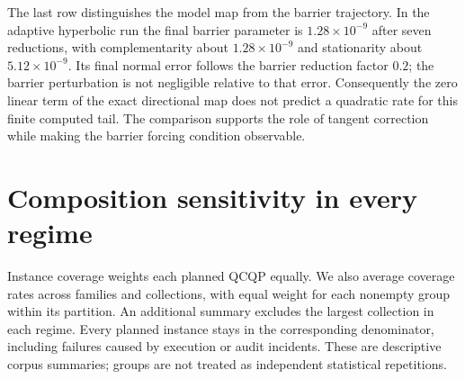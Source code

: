 \documentclass[pdflatex,sn-mathphys-num]{sn-jnl}
\theoremstyle{thmstyleone}
\theoremstyle{thmstylethree}
\begin{document}
The last row distinguishes the model map from the barrier trajectory. In the adaptive hyperbolic run the final barrier parameter
is $1.28\times10^{-9}$ after seven reductions, with complementarity
about $1.28\times10^{-9}$ and stationarity about $5.12\times10^{-9}$.
Its final normal error follows the barrier reduction factor $0.2$;
the barrier perturbation is not negligible relative to that error.
Consequently the zero linear term of the exact directional map does
not predict a quadratic rate for this finite computed tail. The
comparison supports the role of tangent correction while making the
barrier forcing condition observable.

\FloatBarrier
\section{Composition sensitivity in every regime}\label{app:composition}
Instance coverage weights each planned QCQP equally. We also average
coverage rates across families and collections, with equal weight for
each nonempty group within its partition. An additional summary excludes the largest collection in each regime. Every planned instance stays in the corresponding denominator,
including failures caused by execution or audit incidents.
These are descriptive corpus summaries; groups are not treated as independent
statistical repetitions.

\begingroup
\renewenvironment{table*}[1][]{\begin{table}[!htbp]}{\end{table}}
\end{document}
